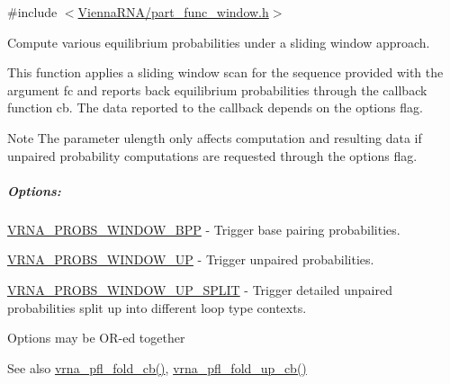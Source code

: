 {\ttfamily \#include $<$\mbox{\hyperlink{part__func__window_8h}{Vienna\+R\+N\+A/part\+\_\+func\+\_\+window.\+h}}$>$}



Compute various equilibrium probabilities under a sliding window approach. 

This function applies a sliding window scan for the sequence provided with the argument {\ttfamily fc} and reports back equilibrium probabilities through the callback function {\ttfamily cb}. The data reported to the callback depends on the {\ttfamily options} flag.

\begin{DoxyNote}{Note}
The parameter {\ttfamily ulength} only affects computation and resulting data if unpaired probability computations are requested through the {\ttfamily options} flag.
\end{DoxyNote}
\subparagraph*{Options\+:}


\begin{DoxyItemize}
\item \mbox{\hyperlink{group__part__func__window_ga296217b76e76e5f7e6927e7210aa9b1f}{V\+R\+N\+A\+\_\+\+P\+R\+O\+B\+S\+\_\+\+W\+I\+N\+D\+O\+W\+\_\+\+B\+PP}} -\/ Trigger base pairing probabilities.
\item \mbox{\hyperlink{group__part__func__window_ga18325811c7dfc7b7d9d4ac37f4353615}{V\+R\+N\+A\+\_\+\+P\+R\+O\+B\+S\+\_\+\+W\+I\+N\+D\+O\+W\+\_\+\+UP}} -\/ Trigger unpaired probabilities.
\item \mbox{\hyperlink{group__part__func__window_ga9068f4ec008bf1c042a9357f5c2c5e13}{V\+R\+N\+A\+\_\+\+P\+R\+O\+B\+S\+\_\+\+W\+I\+N\+D\+O\+W\+\_\+\+U\+P\+\_\+\+S\+P\+L\+IT}} -\/ Trigger detailed unpaired probabilities split up into different loop type contexts.
\end{DoxyItemize}

Options may be O\+R-\/ed together

\begin{DoxySeeAlso}{See also}
\mbox{\hyperlink{group__part__func__window_ga457a60751b2a5225477e3b7735636a5f}{vrna\+\_\+pfl\+\_\+fold\+\_\+cb()}}, \mbox{\hyperlink{group__part__func__window_gac3251d3da0238d6d9ffdd6703b00f1d3}{vrna\+\_\+pfl\+\_\+fold\+\_\+up\+\_\+cb()}}
\end{DoxySeeAlso}

